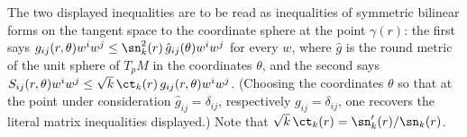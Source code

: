 The two displayed inequalities are to be read as inequalities of
symmetric bilinear forms on the tangent space to the coordinate
sphere at the point $\gamma(r)$: the first says $g_{ij}(r,\theta)w^iw^j\le
\sn_k^2(r)\,\hat g_{ij}(\theta)w^iw^j$ for every $w$, where $\hat g$
is the round metric of the unit sphere of $T_pM$ in the coordinates
$\theta$, and the second says $S_{ij}(r,\theta)w^iw^j\le
\sqrt{k}\,\ct_k(r)\,g_{ij}(r,\theta)w^iw^j$. (Choosing the
coordinates $\theta$ so that at the point under consideration
$\hat g_{ij}=\delta_{ij}$, respectively $g_{ij}=\delta_{ij}$, one
recovers the literal matrix inequalities displayed.) Note that
$\sqrt k\,\ct_k(r)=\sn_k'(r)/\sn_k(r)$.

%
%

